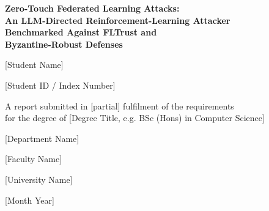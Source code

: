 
\begin{titlepage}
\begin{center}

\vspace*{1.5cm}

{\LARGE \bfseries Zero-Touch Federated Learning Attacks:\\[0.3cm]
An LLM-Directed Reinforcement-Learning Attacker\\[0.3cm]
Benchmarked Against FLTrust and\\[0.3cm]
Byzantine-Robust Defenses \par}

\vspace{2cm}

{\large [Student Name] \par}
{\large [Student ID / Index Number] \par}

\vspace{2cm}

{\large A report submitted in [partial] fulfilment of the requirements\\
for the degree of [Degree Title, e.g. BSc (Hons) in Computer Science] \par}

\vspace{2cm}

\begin{figure}[h]
\centering
\end{figure}

{\large [Department Name] \par}
{\large [Faculty Name] \par}
{\large [University Name] \par}

\vspace{1.5cm}

{\large [Month Year] \par}

\end{center}
\end{titlepage}

